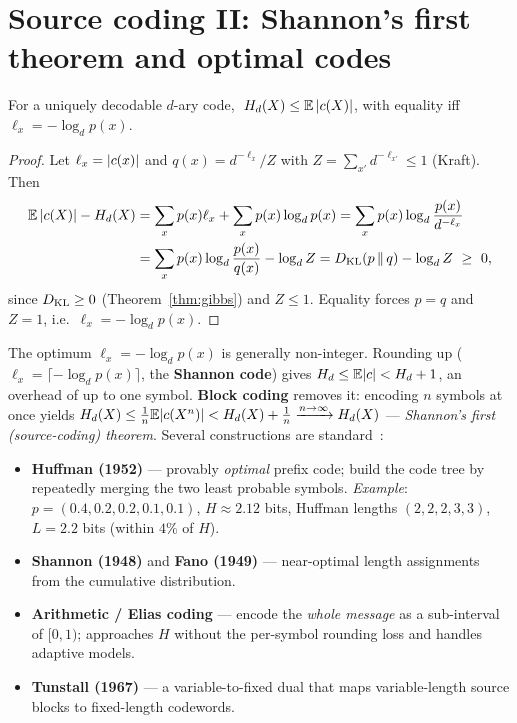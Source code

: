 \documentclass[11pt]{article}
\begin{document}
\section{Source coding II: Shannon's first theorem and optimal codes}
\begin{theorem}\label{thm:src}
For a uniquely decodable $d$-ary code, $\;H_d(X)\le\mathbb{E}\,\lvert c(X)\rvert$, with equality iff
$\ell_x=-\log_d p(x)$.
\end{theorem}
\begin{proof}
Let $\ell_x=\lvert c(x)\rvert$ and $q(x)=d^{-\ell_x}/Z$ with $Z=\sum_{x'}d^{-\ell_{x'}}\le1$ (Kraft). Then
\begin{align}
  \mathbb{E}\,\lvert c(X)\rvert-H_d(X)
  &=\sum_x p(x)\ell_x+\sum_x p(x)\log_d p(x)
   =\sum_x p(x)\log_d\frac{p(x)}{d^{-\ell_x}}\notag\\
  &=\sum_x p(x)\log_d\frac{p(x)}{q(x)}-\log_d Z
   =D_{\mathrm{KL}}(p\,\|\,q)-\log_d Z\ \ge\ 0,
\end{align}
since $D_{\mathrm{KL}}\ge0$ (Theorem~\ref{thm:gibbs}) and $Z\le1$. Equality forces $p=q$ and $Z=1$, i.e.\
$\ell_x=-\log_d p(x)$.
\end{proof}
The optimum $\ell_x=-\log_d p(x)$ is generally non-integer. Rounding up ($\ell_x=\lceil-\log_d
p(x)\rceil$, the \textbf{Shannon code}) gives $H_d\le\mathbb{E}\lvert c\rvert<H_d+1$, an overhead of up to one
symbol. \textbf{Block coding} removes it: encoding $n$ symbols at once yields
$H_d(X)\le\frac1n\mathbb{E}\lvert c(X^n)\rvert<H_d(X)+\frac1n\xrightarrow{n\to\infty}H_d(X)$ --- \emph{Shannon's
first (source-coding) theorem}. Several constructions are standard~\cite{cohen2024,mackay2003}:
\begin{itemize}[leftmargin=1.5em]
  \item \textbf{Huffman (1952)} --- provably \emph{optimal} prefix code; build the code tree by
  repeatedly merging the two least probable symbols. \emph{Example}: $p=(0.4,0.2,0.2,0.1,0.1)$,
  $H\approx2.12$ bits, Huffman lengths $(2,2,2,3,3)$, $L=2.2$ bits (within $4\%$ of $H$).
  \item \textbf{Shannon (1948)} and \textbf{Fano (1949)} --- near-optimal length assignments from the
  cumulative distribution.
  \item \textbf{Arithmetic / Elias coding} --- encode the \emph{whole message} as a sub-interval of
  $[0,1)$; approaches $H$ without the per-symbol rounding loss and handles adaptive models.
  \item \textbf{Tunstall (1967)} --- a variable-to-fixed dual that maps variable-length source blocks
  to fixed-length codewords.
\end{itemize}
\end{document}
